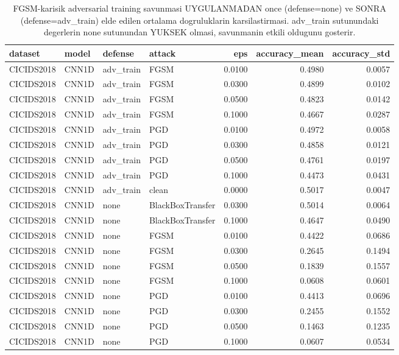 \begin{table}[ht]
\centering
\caption{FGSM-karisik adversarial training savunmasi UYGULANMADAN once (defense=none) ve SONRA (defense=adv_train) elde edilen ortalama dogruluklarin karsilastirmasi. adv_train sutunundaki degerlerin none sutunundan YUKSEK olmasi, savunmanin etkili oldugunu gosterir.}
\label{tab:T5_savunma_etkinligi}
\begin{tabular}{llllrrr}
\toprule
dataset & model & defense & attack & eps & accuracy\_mean & accuracy\_std \\
\midrule
CICIDS2018 & CNN1D & adv\_train & FGSM & 0.0100 & 0.4980 & 0.0057 \\
CICIDS2018 & CNN1D & adv\_train & FGSM & 0.0300 & 0.4899 & 0.0102 \\
CICIDS2018 & CNN1D & adv\_train & FGSM & 0.0500 & 0.4823 & 0.0142 \\
CICIDS2018 & CNN1D & adv\_train & FGSM & 0.1000 & 0.4667 & 0.0287 \\
CICIDS2018 & CNN1D & adv\_train & PGD & 0.0100 & 0.4972 & 0.0058 \\
CICIDS2018 & CNN1D & adv\_train & PGD & 0.0300 & 0.4858 & 0.0121 \\
CICIDS2018 & CNN1D & adv\_train & PGD & 0.0500 & 0.4761 & 0.0197 \\
CICIDS2018 & CNN1D & adv\_train & PGD & 0.1000 & 0.4473 & 0.0431 \\
CICIDS2018 & CNN1D & adv\_train & clean & 0.0000 & 0.5017 & 0.0047 \\
CICIDS2018 & CNN1D & none & BlackBoxTransfer & 0.0300 & 0.5014 & 0.0064 \\
CICIDS2018 & CNN1D & none & BlackBoxTransfer & 0.1000 & 0.4647 & 0.0490 \\
CICIDS2018 & CNN1D & none & FGSM & 0.0100 & 0.4422 & 0.0686 \\
CICIDS2018 & CNN1D & none & FGSM & 0.0300 & 0.2645 & 0.1494 \\
CICIDS2018 & CNN1D & none & FGSM & 0.0500 & 0.1839 & 0.1557 \\
CICIDS2018 & CNN1D & none & FGSM & 0.1000 & 0.0608 & 0.0601 \\
CICIDS2018 & CNN1D & none & PGD & 0.0100 & 0.4413 & 0.0696 \\
CICIDS2018 & CNN1D & none & PGD & 0.0300 & 0.2455 & 0.1552 \\
CICIDS2018 & CNN1D & none & PGD & 0.0500 & 0.1463 & 0.1235 \\
CICIDS2018 & CNN1D & none & PGD & 0.1000 & 0.0607 & 0.0534 \\

\end{tabular}
\end{table}
